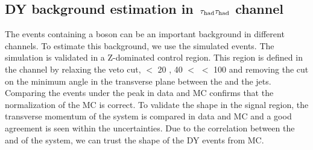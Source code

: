 \subsection{\texorpdfstring{DY background estimation in $\,\tau_{\rm had}\tau_{\rm had}$ channel}{DY background estimation in tau-tau channel}}
The events containing a \Z boson can be an important background in different channels. To
estimate this background, we use the simulated events. The simulation
is validated in a Z-dominated control region.
This region is defined in the \muTau channel by relaxing  the \Z veto cut, \mttwo $<$ 20 \GeV, 40 $<$ \tauMT $<$ 100 \GeV and 
removing the cut on the minimum angle in the transverse plane between the \MET and the jets. Comparing the events under the \Z peak in data and MC 
confirms that the normalization of the  MC is correct. To validate the shape in the signal region, 
the transverse momentum of the \Z system is compared in data 
and MC  and a good agreement is seen within the uncertainties. Due to the correlation between the \mttwo and \pt of the \Z system, we can trust the shape of the DY events from MC. 


